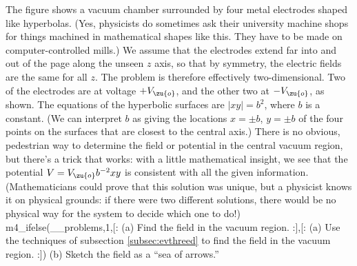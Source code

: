 The figure shows a vacuum chamber surrounded by four metal electrodes shaped
        like hyperbolas. (Yes, physicists do sometimes ask their university machine
        shops for things machined in mathematical shapes like this. They have to be made
        on computer-controlled mills.) We assume that the
        electrodes extend far into and out of the page along the unseen $z$ axis, so
        that by symmetry, the electric fields are the same for all $z$. The problem is
        therefore effectively two-dimensional. Two of the electrodes are at voltage $+V_\zu{o}$,
        and the other two at $-V_\zu{o}$, as shown. The equations of the hyperbolic surfaces
        are $|xy|=b^2$, where $b$ is a constant. (We can interpret $b$ as giving the locations
        $x=\pm b$, $y=\pm b$ of the four points on the surfaces that are closest to the
        central axis.) There is no obvious, pedestrian way to
        determine the field or potential in the central vacuum region, but there's a trick that
        works: with a little mathematical insight, we see that the potential $V=V_\zu{o}b^{-2}xy$
        is consistent with all the given information. (Mathematicians could prove that this
        solution was unique, but a physicist knows it on physical grounds: if there were two
        different solutions, there would be no physical way for the system to decide which
        one to do!)\\
m4_ifelse(__problems,1,[:%
(a) Find the field in the vacuum region.\answercheck
:],[:%
(a) Use the techniques of subsection \ref{subsec:evthreed}
        to find the field in the vacuum region.\answercheck
:])
(b) Sketch the field as a ``sea of arrows.''
